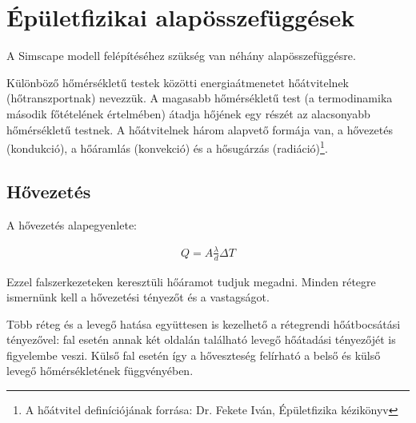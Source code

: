  


\section{Épületfizikai alapösszefüggések}
 
 A Simscape modell felépítéséhez szükség van néhány alapösszefüggésre.
 
 Különböző hőmérsékletű testek közötti energiaátmenetet hőátvitelnek
 (hőtranszportnak) nevezzük. A magasabb hőmérsékletű
 test (a termodinamika második főtételének értelmében) átadja hőjének
 egy részét az alacsonyabb hőmérsékletű testnek.
A hőátvitelnek három alapvető formája van, a hővezetés (kondukció), a hőáramlás (konvekció) és a hősugárzás (radiáció)\footnote{A hőátvitel definíciójának forrása: Dr. Fekete Iván, Épületfizika kézikönyv}.
 

\begin{table}[H]
	\footnotesize
	\centering
	
	\caption{Hőközlés fajtái}
	\label{tab:HeatExchangeTypes}
\end{table}

\subsection{Hővezetés}

A hővezetés alapegyenlete:

\begin{equation} \label{eq_hovezetes}
\begin{aligned}
Q = A \frac{\lambda}{d} \Delta T
\end{aligned}
\end{equation}

Ezzel falszerkezeteken keresztüli hőáramot tudjuk megadni. Minden rétegre ismernünk kell a hővezetési tényezőt és a vastagságot.

Több réteg és a levegő hatása együttesen is kezelhető a rétegrendi hőátbocsátási tényezővel: fal esetén annak két oldalán található levegő hőátadási tényezőjét is figyelembe veszi. Külső fal esetén így a hőveszteség felírható a belső és külső levegő hőmérsékletének függvényében. 

